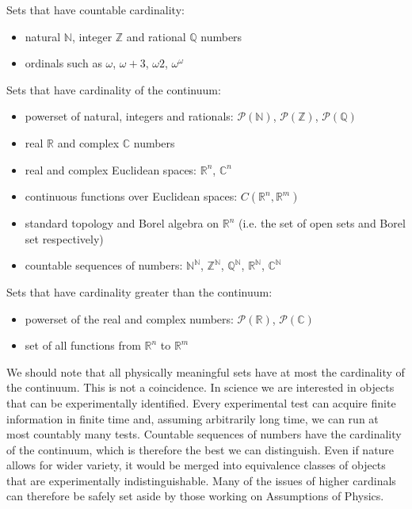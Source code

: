 \documentclass{article}
\begin{document}
\begin{remark}
	Sets that have countable cardinality:
	\begin{itemize}
		\item natural $\mathbb{N}$, integer $\mathbb{Z}$ and rational $\mathbb{Q}$ numbers 
		\item ordinals such as $\omega$, $\omega + 3$, $\omega2$, $\omega^\omega$
	\end{itemize}
	Sets that have cardinality of the continuum:
	\begin{itemize}
		\item powerset of natural, integers and rationals: $\mathcal{P}(\mathbb{N})$, $\mathcal{P}(\mathbb{Z})$, $\mathcal{P}(\mathbb{Q})$
		\item real $\mathbb{R}$ and complex $\mathbb{C}$ numbers
		\item real and complex Euclidean spaces: $\mathbb{R}^n$, $\mathbb{C}^n$
		\item continuous functions over Euclidean spaces: $C(\mathbb{R}^n, \mathbb{R}^m)$
		\item standard topology and Borel algebra on $\mathbb{R}^n$ (i.e. the set of open sets and Borel set respectively)
		\item countable sequences of numbers: $\mathbb{N}^\mathbb{N}$, $\mathbb{Z}^\mathbb{N}$, $\mathbb{Q}^\mathbb{N}$, $\mathbb{R}^\mathbb{N}$, $\mathbb{C}^\mathbb{N}$
	\end{itemize}
	Sets that have cardinality greater than the continuum:
	\begin{itemize}
		\item powerset of the real and complex numbers: $\mathcal{P}(\mathbb{R})$, $\mathcal{P}(\mathbb{C})$
		\item set of all functions from $\mathbb{R}^n$ to $\mathbb{R}^m$
	\end{itemize}

	We should note that all physically meaningful sets have at most the cardinality of the continuum. This is not a coincidence. In science we are interested in objects that can be experimentally identified. Every experimental test can acquire finite information in finite time and, assuming arbitrarily long time, we can run at most countably many tests. Countable sequences of numbers have the cardinality of the continuum, which is therefore the best we can distinguish. Even if nature allows for wider variety, it would be merged into equivalence classes of objects that are experimentally indistinguishable. Many of the issues of higher cardinals can therefore be safely set aside by those working on Assumptions of Physics.
\end{remark}
\end{document}
